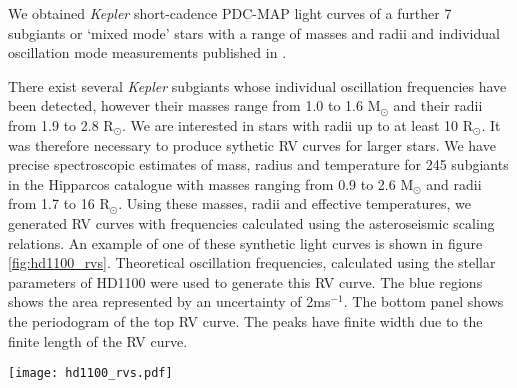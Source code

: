 \documentclass[useAMS, usenatbib]{aastex}
\newcommand{\nsubs}{7}
\begin{document}
We obtained {\it Kepler} short-cadence PDC-MAP light curves of a further
\nsubs$~$ subgiants or `mixed mode' stars with a range of masses and radii and
individual oscillation mode measurements published in \citet{Appourchaux2012}.

There exist several {\it Kepler} subgiants whose individual oscillation
frequencies have been detected, however their masses range from 1.0 to 1.6
M$_\odot$ and their radii from 1.9 to 2.8 R$_\odot$.
We are interested in stars with radii up to at least 10 R$_\odot$.
It was therefore necessary to produce sythetic RV curves for larger stars.
We have precise spectroscopic estimates of mass, radius and temperature for
245 subgiants in the Hipparcos catalogue with masses ranging from 0.9 to 2.6
M$_\odot$ and radii from 1.7 to 16 R$_\odot$.
Using these masses, radii and effective temperatures, we generated RV curves
with frequencies calculated using the asteroseismic scaling relations.
An example of one of these synthetic light curves is shown in figure
\ref{fig:hd1100_rvs}.
Theoretical oscillation frequencies, calculated using the stellar parameters
of HD1100 were used to generate this RV curve.
The blue regions shows the area represented by an uncertainty of 2ms$^{-1}$.
The bottom panel shows the periodogram of the top RV curve.
The peaks have finite width due to the finite length of the RV curve.

\begin{figure*}
\begin{center}
\texttt{[image: hd1100\_rvs.pdf]}
\caption{{\it (Top)} Simulated RV curve generated using 12
theoretical oscillation frequencies, based on the stellar parameters of HD1100.
The blue region shows the area represented by an uncertainty of 2ms$^{-1}$.
{\it (Bottom)} The periodogram of the top RV curve. The peaks have a finite
width due to the finite length of the time series.}
\label{fig:hd1100_rvs}
\end{center}
\end{figure*}

\end{document}
